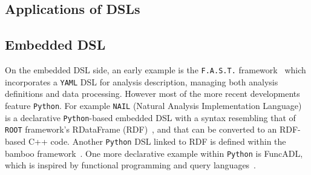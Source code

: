 \documentclass[11pt]{article}
\begin{document}
\def\thefootnote{\fnsymbol{footnote}}
\setcounter{footnote}{0}




%
\clearpage
\printglossaries

\begin{appendices}

    \section{Applications of DSLs}
    \label{app:dsl}
    \subsection{Embedded DSL}
    On the embedded \gls{DSL} side, an early example is the \texttt{F.A.S.T.} framework~\cite{FAST} which incorporates a \texttt{YAML} \gls{DSL} for analysis description, managing both analysis definitions and data processing. However most of the more recent developments feature \texttt{Python}. For example \texttt{NAIL} (Natural Analysis Implementation Language)~\cite{NAIL} is a declarative \texttt{Python}-based embedded \gls{DSL} with a syntax resembling that of \texttt{ROOT} framework's RDataFrame (RDF)~\cite{enrico_guiraud_2017_260230}, and that can be converted to an RDF-based C++ code.  Another \texttt{Python} \gls{DSL} linked to RDF is defined within the bamboo framework~\cite{David:2021ohq}.  One more declarative example within \texttt{Python} is FuncADL, which is inspired by functional programming and query languages~\cite{Proffitt:2021wfh}.
    

\end{appendices}
\end{document}
